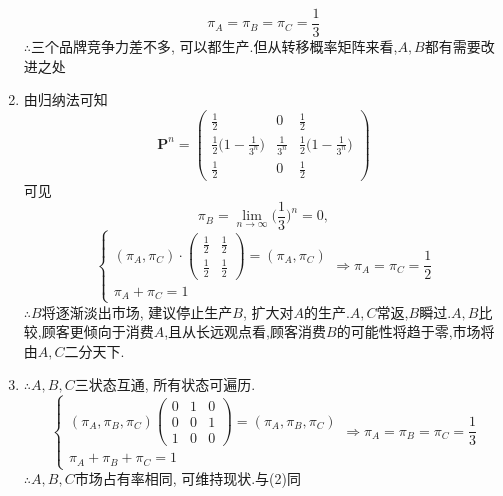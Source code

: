 \begin{solution}
\begin{enumerate}[label=(\arabic*)]
\[			      \pi_A = \pi_B = \pi_C = \frac{1}{3}
		      \]
		      $\therefore$三个品牌竞争力差不多, 可以都生产.但从转移概率矩阵来看,$A,B$都有需要改进之处
		\item 由归纳法可知
		      \[
			      \bm{P}^n=
			      \begin{pmatrix}
				      \frac{1}{2}                          & 0             & \frac{1}{2}                          \\
				      \frac{1}{2}\big(1-\frac{1}{3^n}\big) & \frac{1}{3^n} & \frac{1}{2}\big(1-\frac{1}{3^n}\big) \\
				      \frac{1}{2}                          & 0             & \frac{1}{2}
			      \end{pmatrix}
		      \]
		      可见
		      \[\pi_B = \lim_{n\to \infty} \Big(\frac{1}{3}\Big)^n = 0,\]
		      \[
			      \begin{cases}
				      (\pi_A, \pi_C)\cdot
				      \begin{pmatrix}
					      \frac{1}{2} & \frac{1}{2} \\
					      \frac{1}{2} & \frac{1}{2}
				      \end{pmatrix} = (\pi_A, \pi_C) \\
				      \pi_A + \pi_C = 1
			      \end{cases} \Rightarrow
			      \pi_A = \pi_C = \frac{1}{2}
		      \]
		      $\therefore B$将逐渐淡出市场, 建议停止生产$B$, 扩大对$A$的生产.$A,C$常返,$B$瞬过.$A,B$比较,顾客更倾向于消费$A$,且从长远观点看,顾客消费$B$的可能性将趋于零,市场将由$A,C$二分天下.
		\item $\therefore A,B,C$三状态互通, 所有状态可遍历.
		      \[
			      \begin{cases}
				      (\pi_A,\pi_B,\pi_C)
				      \begin{pmatrix}
					      0 & 1 & 0 \\
					      0 & 0 & 1 \\
					      1 & 0 & 0
				      \end{pmatrix} = (\pi_A,\pi_B,\pi_C) \\
				      \pi_A+\pi_B+\pi_C = 1
			      \end{cases} \Rightarrow
			      \pi_A = \pi_B = \pi_C = \frac{1}{3}
		      \]
		      $\therefore A,B,C$市场占有率相同, 可维持现状.与(2)同
		      \begin{figure}[H]
			      \centering
\end{figure}
\end{enumerate}
\end{solution}

